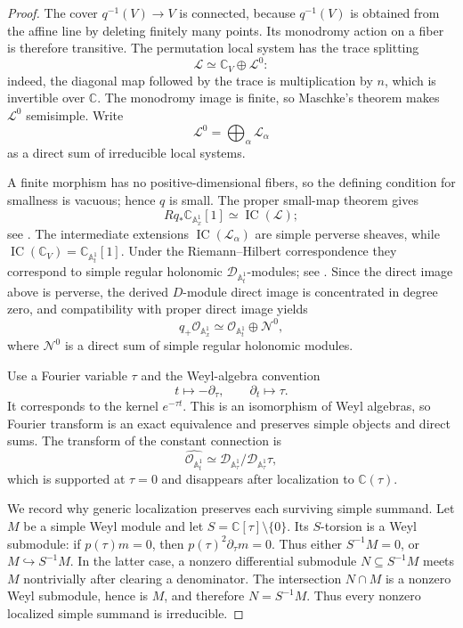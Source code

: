 \documentclass[11pt]{article}
\numberwithin{equation}{section}
\theoremstyle{definition}
\theoremstyle{remark}
\newcommand{\C}{\mathbb C}
\newcommand{\Aone}{\mathbb A^1}
\newcommand{\Ncal}{\mathcal N}
\newcommand{\Lcal}{\mathscr L}
\newcommand{\Dmod}{\mathcal D}
\newcommand{\Ocal}{\mathcal O}
\begin{document}
\begin{proof}
The cover $q^{-1}(V)\to V$ is connected, because $q^{-1}(V)$ is obtained
from the affine line by deleting finitely many points.  Its monodromy action
on a fiber is therefore transitive.  The permutation local system has the
trace splitting
\[
  \Lcal\simeq\C_V\oplus\Lcal^0:
\]
indeed, the diagonal map followed by the trace is multiplication by
$n$, which is invertible over $\C$.  The monodromy image is finite, so
Maschke's theorem makes $\Lcal^0$ semisimple.  Write
\[
  \Lcal^0=\bigoplus_\alpha\Lcal_\alpha
\]
as a direct sum of irreducible local systems.

A finite morphism has no positive-dimensional fibers, so the defining
condition for smallness is vacuous; hence $q$ is small.  The proper small-map
theorem gives
\[
  Rq_*\C_{\Aone_x}[1]\simeq\operatorname{IC}(\Lcal);
\]
see \cite[Proposition~4.2.1 and Remark~4.2.4]{deCataldoMigliorini}.  The
intermediate extensions $\operatorname{IC}(\Lcal_\alpha)$ are simple
perverse sheaves, while
$\operatorname{IC}(\C_V)=\C_{\Aone_t}[1]$.  Under the Riemann--Hilbert
correspondence they correspond to simple regular holonomic
$\Dmod_{\Aone_t}$-modules; see
\cite[\S\S3.4, 7.1--7.2, and 8.2.2]{HTT}.  Since the direct image above is
perverse, the derived $D$-module direct image is concentrated in degree zero,
and compatibility with proper direct image yields
\begin{equation}\label{eq:direct-image-splitting}
  q_+\Ocal_{\Aone_x}
  \simeq
  \Ocal_{\Aone_t}\oplus\Ncal^0,
\end{equation}
where $\Ncal^0$ is a direct sum of simple regular holonomic modules.

Use a Fourier variable $\tau$ and the Weyl-algebra convention
\begin{equation}\label{eq:Fourier-convention}
  t\longmapsto-\partial_\tau,
  \qquad
  \partial_t\longmapsto\tau.
\end{equation}
It corresponds to the kernel $e^{-\tau t}$.  This is an isomorphism of Weyl
algebras, so Fourier transform is an exact equivalence and preserves simple
objects and direct sums.  The transform of the constant connection is
\[
  \widehat{\Ocal_{\Aone_t}}
  \simeq
  \Dmod_{\Aone_\tau}/\Dmod_{\Aone_\tau}\tau,
\]
which is supported at $\tau=0$ and disappears after localization to
$\C(\tau)$.

We record why generic localization preserves each surviving simple summand.
Let $M$ be a simple Weyl module and let $S=\C[\tau]\setminus\{0\}$.  Its
$S$-torsion is a Weyl submodule: if $p(\tau)m=0$, then
$p(\tau)^2\partial_\tau m=0$.  Thus either $S^{-1}M=0$, or
$M\hookrightarrow S^{-1}M$.  In the latter case, a nonzero differential
submodule $N\subseteq S^{-1}M$ meets $M$ nontrivially after clearing a
denominator.  The intersection $N\cap M$ is a nonzero Weyl submodule, hence
is $M$, and therefore $N=S^{-1}M$.  Thus every nonzero localized simple
summand is irreducible.


\end{proof}
\end{document}
